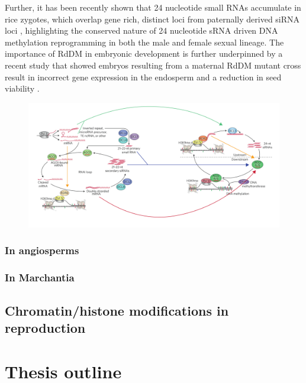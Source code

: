 Further, it has been recently shown that 24 nucleotide small RNAs accumulate in rice zygotes, which overlap gene rich, distinct loci from paternally derived siRNA loci \citep{RN166}, highlighting the conserved nature of 24 nucleotide sRNA driven DNA methylation reprogramming in both the male and female sexual lineage. The importance of RdDM in embryonic development is further underpinned by a recent study that showed embryos resulting from a maternal RdDM mutant cross result in incorrect gene expression in the endosperm and a reduction in seed viability \citep{RN167}.

\begin{landscape}
\begin{figure}[htbp!] 
\centering    
    \includegraphics[width=1.5\textwidth]{Chapter1/Figs/ncRdDM.pdf}
\caption{}
\label{fig:ncRdDM}
\captionsetup{font=small}
    \caption*{}
\end{figure}
\end{landscape}



\subsubsection{In angiosperms}
\subsubsection{In Marchantia}
\subsection{Chromatin/histone modifications in reproduction}

\section{Thesis outline} %

